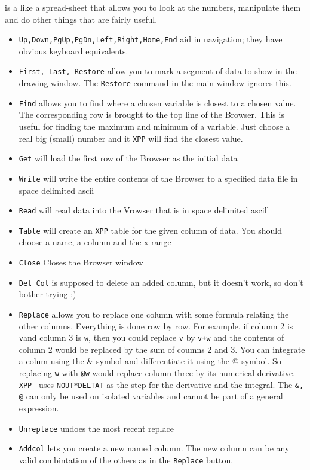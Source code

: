 \documentclass{article}
\begin{document}
\bigskip
{} is a like a spread-sheet that allows you to look at the numbers, manipulate them and do other things that are fairly useful.
\begin{itemize}
\item {\tt Up,Down,PgUp,PgDn,Left,Right,Home,End} aid in navigation; they have obvious keyboard equivalents. 

\item {\tt First, Last, Restore} allow you to mark a segment of data to show in the drawing window. The {\tt Restore} command in the main window ignores this. 
\item {\tt Find} allows you to find where a chosen variable is closest to a chosen value. The corresponding row is brought to the top line of the Browser. This is useful for finding the maximum and minimum of a variable. Just choose a real big (small) number and it {\tt XPP} will find the closest value. 
\item{\tt Get} will load the first row of the Browser as the initial data
\item{\tt Write} will write the entire contents of the Browser to a specified data file in space delimited ascii
\item{\tt Read} will read data into the Vrowser that is in space delimited ascill
\item{\tt Table} will create an {\tt XPP} table for the given column of data. You should choose a name, a column and the x-range
\item{\tt Close} Closes the Browser window
\item{\tt Del Col} is supposed to delete an added column, but it doesn't work, so don't bother trying :)
\item{\tt Replace} allows you to replace one column with some formula relating the other columns. Everything is done row by row. For example, if column 2 is {\tt v}and column 3 is {\tt w}, then you could replace {\tt v} by {\tt v+w} and the contents of column 2 would be replaced by the sum of coumns 2 and 3.  You can integrate a colum using the \& symbol and differentiate it using the @ symbol. So replacing {\tt w} with {\tt @w} would replace column three by its numerical derivative. {\tt XPP } uses {\tt NOUT*DELTAT} as the step for the derivative and the integral. The {\tt \&, @} can only be used on isolated variables and cannot be part of a general expression.  
\item{\tt Unreplace} undoes the most recent replace
\item{\tt Addcol} lets you create a new named column. The new column can be any valid combintation of the others as in the {\tt Replace} button.
\end{itemize}
\end{document}
